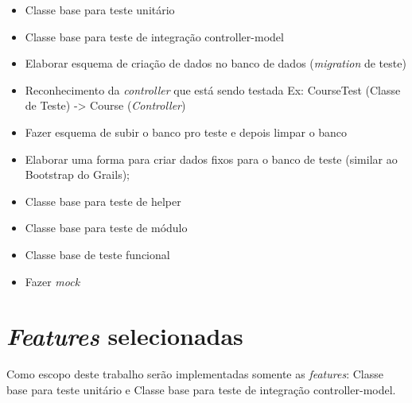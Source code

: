 \begin{itemize}

	\item Classe base para teste unitário
	\item Classe base para teste de integração controller-model
	\item Elaborar esquema de criação de dados no banco de dados (\textit{migration} de teste)
	\item Reconhecimento da \textit{controller} que está sendo testada
		\subitem Ex: CourseTest (Classe de Teste) -> Course (\textit{Controller})
	\item Fazer esquema de subir o banco pro teste e depois limpar o banco
	\item Elaborar uma forma para criar dados fixos para o banco de teste (similar ao Bootstrap do Grails);
	\item Classe base para teste de helper
	\item Classe base para teste de módulo
	\item Classe base de teste funcional
	\item Fazer \textit{mock}

\end{itemize}

\section{\textit{Features} selecionadas}

Como escopo deste trabalho serão implementadas somente as \textit{features}: Classe base para teste unitário
e Classe base para teste de integração controller-model.